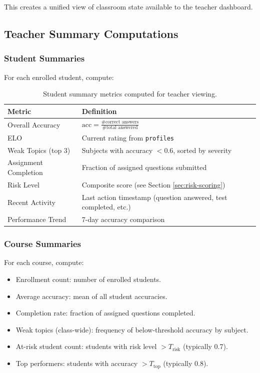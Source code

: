 \documentclass[sigconf,authordraft,twoside]{acmart}
\newcommand{\tech}[1]{\textcolor{brandblue}{\nolinkurl{#1}}}
\begin{document}
This creates a unified view of classroom state available to the teacher dashboard.

\subsection{Teacher Summary Computations}

\subsubsection{Student Summaries}

For each enrolled student, compute:

\begin{table}[t]
\centering
\small
\begin{tabularx}{\columnwidth}{>{\raggedright\arraybackslash}p{} X}
\toprule
\textbf{Metric} & \textbf{Definition} \\
\midrule
Overall Accuracy & $\text{acc} = \frac{\text{\# correct answers}}{\text{\# total answered}}$ \\
ELO & Current rating from \tech{profiles} \\
Weak Topics (top 3) & Subjects with accuracy $< 0.6$, sorted by severity \\
Assignment Completion & Fraction of assigned questions submitted \\
Risk Level & Composite score (see Section \ref{sec:risk-scoring}) \\
Recent Activity & Last action timestamp (question answered, test completed, etc.) \\
Performance Trend & 7-day accuracy comparison \\
\bottomrule
\end{tabularx}
\caption{Student summary metrics computed for teacher viewing.}
\end{table}

\subsubsection{Course Summaries}

For each course, compute:

\begin{itemize}
\item Enrollment count: number of enrolled students.
\item Average accuracy: mean of all student accuracies.
\item Completion rate: fraction of assigned questions completed.
\item Weak topics (class-wide): frequency of below-threshold accuracy by subject.
\item At-risk student count: students with risk level $> T_{\text{risk}}$ (typically 0.7).
\item Top performers: students with accuracy $> T_{\text{top}}$ (typically 0.8).
\end{itemize}
\end{document}
